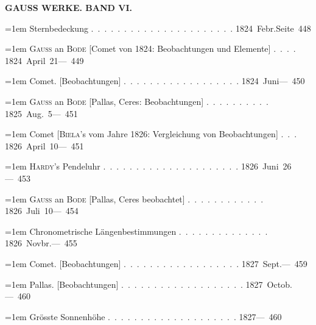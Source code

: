 \clearpage
{}
\noindent{}%
\parbox[b]{\dimexpr\textwidth-20mm\relax}{\centering\small\textbf{GAUSS WERKE. BAND VI.}}%
\makebox[10mm][r]{}\par\nobreak\medskip
\begingroup
\raggedright
\noindent\hangindent=1em Sternbedeckung \mbox{.\ .\ .\ .\ .\ .\ .\ .\ .\ .\ .\ .\ .\ .\ .\ .\ .\ .\ .\ .\ .\ .} \hfill\mbox{1824 Febr.}\quad\mbox{Seite 448}\par\smallskip
\noindent\hangindent=1em \textsc{Gauss} an \textsc{Bode} [Comet von 1824: Beobachtungen und Elemente] \mbox{.\ .\ .\ .} \hfill\mbox{1824 April 21}\quad\mbox{--- 449}\par\smallskip
\noindent\hangindent=1em Comet. [Beobachtungen] \mbox{.\ .\ .\ .\ .\ .\ .\ .\ .\ .\ .\ .\ .\ .\ .\ .\ .\ .} \hfill\mbox{1824 Juni}\quad\mbox{--- 450}\par\smallskip
\noindent\hangindent=1em \textsc{Gauss} an \textsc{Bode} [Pallas, Ceres: Beobachtungen] \mbox{.\ .\ .\ .\ .\ .\ .\ .\ .\ .} \hfill\mbox{1825 Aug. 5}\quad\mbox{--- 451}\par\smallskip
\noindent\hangindent=1em Comet [\textsc{Biela}'s vom Jahre 1826: Vergleichung von Beobachtungen] \mbox{.\ .\ .} \hfill\mbox{1826 April 10}\quad\mbox{--- 451}\par\smallskip
\noindent\hangindent=1em \textsc{Hardy}'s Pendeluhr \mbox{.\ .\ .\ .\ .\ .\ .\ .\ .\ .\ .\ .\ .\ .\ .\ .\ .\ .\ .\ .\ .} \hfill\mbox{1826 Juni 26}\quad\mbox{--- 453}\par\smallskip
\noindent\hangindent=1em \textsc{Gauss} an \textsc{Bode} [Pallas, Ceres beobachtet] \mbox{.\ .\ .\ .\ .\ .\ .\ .\ .\ .\ .\ .} \hfill\mbox{1826 Juli 10}\quad\mbox{--- 454}\par\smallskip
\noindent\hangindent=1em Chronometrische Längenbestimmungen \mbox{.\ .\ .\ .\ .\ .\ .\ .\ .\ .\ .\ .\ .\ .} \hfill\mbox{1826 Novbr.}\quad\mbox{--- 455}\par\smallskip
\noindent\hangindent=1em Comet. [Beobachtungen] \mbox{.\ .\ .\ .\ .\ .\ .\ .\ .\ .\ .\ .\ .\ .\ .\ .\ .\ .} \hfill\mbox{1827 Sept.}\quad\mbox{--- 459}\par\smallskip
\noindent\hangindent=1em Pallas. [Beobachtungen] \mbox{.\ .\ .\ .\ .\ .\ .\ .\ .\ .\ .\ .\ .\ .\ .\ .\ .\ .\ .} \hfill\mbox{1827 Octob.}\quad\mbox{--- 460}\par\smallskip
\noindent\hangindent=1em Grösste Sonnenhöhe \mbox{.\ .\ .\ .\ .\ .\ .\ .\ .\ .\ .\ .\ .\ .\ .\ .\ .\ .\ .\ .} \hfill\mbox{1827}\quad\mbox{--- 460}\par\smallskip
